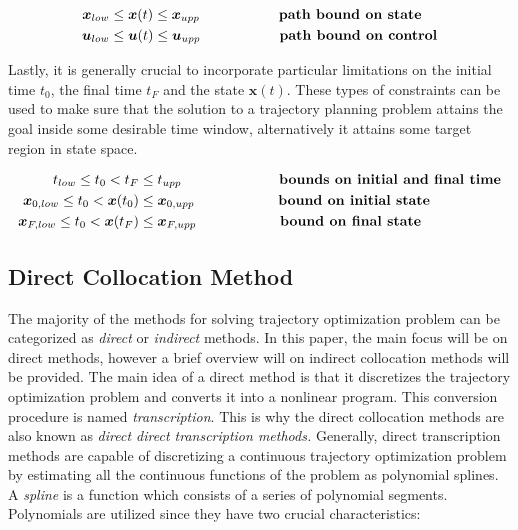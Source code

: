 \documentclass{thesisreport}
\begin{document}
 \begin{align}
 \bm{x}_{low} &\leq \bm{x}(t) \leq \bm{x}_{upp} \space{\hspace{2cm} \textbf{path bound on state}} \\
 \bm{u}_{low} &\leq \bm{u}(t) \leq \bm{u}_{upp} \space{\hspace{2cm} \textbf{path bound on control}} 
 \end{align}

Lastly, it is generally crucial to incorporate particular limitations on the initial time $t_0$, the final time $t_F$ and the state $\bm{x}(t)$. These types of constraints can be used to make sure that the solution to a trajectory planning problem attains the goal inside some desirable time window, alternatively it attains some target region in state space.


\begin{align}
t_{low} \leq t_0 < t_F &\leq t_{upp} \text{\hspace{2.35cm} \textbf{bounds on initial and final time}}\\
\bm{x}_{0,low} \leq t_0 < \bm{x}(t_0) &\leq \bm{x}_{0,upp} \text{\hspace{2cm} \textbf{bound on initial state}}\\
\bm{x}_{F,low} \leq t_0 < \bm{x}(t_F) &\leq \bm{x}_{F,upp} \text{\hspace{2cm} \textbf{bound on final state}}\label{bound_on_final_state}
\end{align}
 
 
 \subsection{Direct Collocation Method}
 
 The majority of the methods for solving trajectory optimization problem can be categorized as \textit{direct} or \textit{indirect} methods. In this paper, the main focus will be on direct methods,  however a brief overview will on indirect collocation methods will be provided. The main idea of a direct method is that it discretizes the trajectory optimization problem and converts it into a nonlinear program. This conversion procedure is named \textit{transcription}. This is why the direct collocation methods are also known as \textit{direct direct transcription methods.} Generally, direct transcription methods are capable of discretizing a continuous trajectory optimization problem by estimating all the continuous functions of the problem as polynomial splines. A \textit{spline} is a function which consists of a series of polynomial segments. Polynomials are utilized since they have two crucial characteristics:
 
\end{document}
